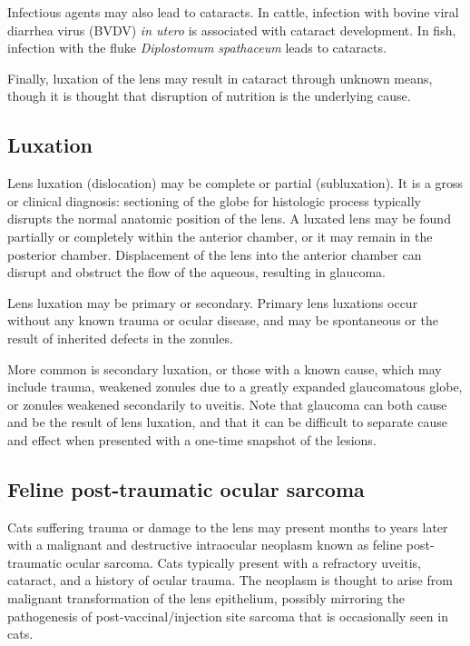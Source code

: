 \documentclass[
  openany]{article}
\begin{document}
Infectious agents may also lead to cataracts. In cattle, infection with bovine viral diarrhea virus (BVDV) \emph{in utero} is associated with cataract development. In fish, infection with the fluke \emph{Diplostomum spathaceum} leads to cataracts.

Finally, luxation of the lens may result in cataract through unknown means, though it is thought that disruption of nutrition is the underlying cause.

\hypertarget{luxation}{%
\subsection{Luxation}\label{luxation}}

Lens luxation (dislocation) may be complete or partial (subluxation). It is a gross or clinical diagnosis: sectioning of the globe for histologic process typically disrupts the normal anatomic position of the lens. A luxated lens may be found partially or completely within the anterior chamber, or it may remain in the posterior chamber. Displacement of the lens into the anterior chamber can disrupt and obstruct the flow of the aqueous, resulting in glaucoma.

Lens luxation may be primary or secondary. Primary lens luxations occur without any known trauma or ocular disease, and may be spontaneous or the result of inherited defects in the zonules.

More common is secondary luxation, or those with a known cause, which may include trauma, weakened zonules due to a greatly expanded glaucomatous globe, or zonules weakened secondarily to uveitis. Note that glaucoma can both cause and be the result of lens luxation, and that it can be difficult to separate cause and effect when presented with a one-time snapshot of the lesions.

\hypertarget{feline-post-traumatic-ocular-sarcoma}{%
\subsection{Feline post-traumatic ocular sarcoma}\label{feline-post-traumatic-ocular-sarcoma}}

Cats suffering trauma or damage to the lens may present months to years later with a malignant and destructive intraocular neoplasm known as feline post-traumatic ocular sarcoma. Cats typically present with a refractory uveitis, cataract, and a history of ocular trauma. The neoplasm is thought to arise from malignant transformation of the lens epithelium, possibly mirroring the pathogenesis of post-vaccinal/injection site sarcoma that is occasionally seen in cats.
\end{document}
